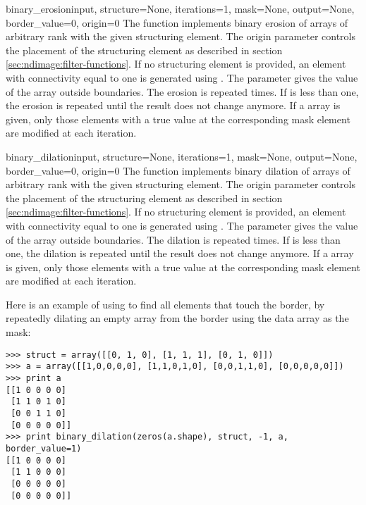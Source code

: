 \begin{funcdesc}{binary_erosion}{input, structure=None, iterations=1,
    mask=None, output=None, border_value=0, origin=0} The
   function implements binary erosion of arrays of
  arbitrary rank with the given structuring element. The origin parameter
  controls the placement of the structuring element as described in section
  \ref{sec:ndimage:filter-functions}. If no structuring element is 
  provided, an element with connectivity equal to one is generated using
  . The  parameter 
  gives the value of the array outside boundaries. The erosion is repeated
   times. If  is less than one, the erosion 
  is repeated until the result does not change anymore. If a  
  array is given, only those elements with a true value at the 
  corresponding mask element are modified at each iteration.
\end{funcdesc}

\begin{funcdesc}{binary_dilation}{input, structure=None, iterations=1,
    mask=None, output=None, border_value=0, origin=0} The
   function implements binary dilation of arrays 
  of arbitrary rank with the given structuring element. The origin 
  parameter controls the placement of the structuring element as described 
  in section \ref{sec:ndimage:filter-functions}. If no structuring element 
  is provided, an element with connectivity equal to one is generated using
  . The  parameter 
  gives the value of the array outside boundaries. The dilation is repeated
   times.  If  is less than one, the 
  dilation is repeated until the result does not change anymore. If a 
   array is given, only those elements with a true value at the 
  corresponding mask element are modified at each iteration.

  Here is an example of using  to find all 
  elements that touch the border, by repeatedly dilating an empty array 
  from the border using the data array as the mask:
\begin{verbatim}
>>> struct = array([[0, 1, 0], [1, 1, 1], [0, 1, 0]])
>>> a = array([[1,0,0,0,0], [1,1,0,1,0], [0,0,1,1,0], [0,0,0,0,0]])
>>> print a
[[1 0 0 0 0]
 [1 1 0 1 0]
 [0 0 1 1 0]
 [0 0 0 0 0]]
>>> print binary_dilation(zeros(a.shape), struct, -1, a, border_value=1)
[[1 0 0 0 0]
 [1 1 0 0 0]
 [0 0 0 0 0]
 [0 0 0 0 0]]
\end{verbatim}
\end{funcdesc}

